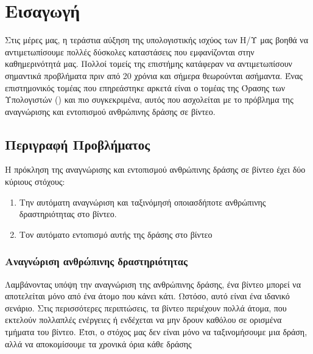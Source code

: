 



% 
\gr
\chapter{Εισαγωγή}
Στις μέρες μας, η τεράστια αύξηση της υπολογιστικής ισχύος των Η/Υ μας βοηθά να αντιμετωπίσουμε πολλές δύσκολες καταστάσεις που εμφανίζονται στην καθημερινότητά μας.
Πολλοί τομείς της επιστήμης κατάφεραν να αντιμετωπίσουν σημαντικά προβλήματα πριν από 20 χρόνια και σήμερα θεωρούνται ασήμαντα. Ένας επιστημονικός τομέας που επηρεάστηκε
αρκετά είναι ο τομέας της Όρασης των Υπολογιστών () και πιο συγκεκριμένα, αυτός που ασχολείται με το πρόβλημα της αναγνώρισης και  εντοπισμού ανθρώπινης δράσης σε βίντεο.
\section{Περιγραφή Προβλήματος}
H πρόκληση της αναγνώρισης και εντοπισμού ανθρώπινης δράσης σε βίντεο έχει δύο κύριους στόχους:
\begin{enumerate}
\item Την αυτόματη αναγνώριση και ταξινόμησή οποιασδήποτε ανθρώπινης δραστηριότητας στο βίντεο.
\item Τον αυτόματο εντοπισμό αυτής της δράσης στο βίντεο
\end{enumerate}


\subsection{Αναγνώριση ανθρώπινης δραστηριότητας}
Λαμβάνοντας υπόψη την αναγνώριση της ανθρώπινης δράσης, ένα βίντεο μπορεί να αποτελείται μόνο από ένα άτομο που κάνει κάτι. Ωστόσο, αυτό είναι ένα ιδανικό
σενάριο. Στις περισσότερες περιπτώσεις, τα βίντεο περιέχουν πολλά άτομα, που εκτελούν πολλαπλές ενέργειες ή ενδέχεται να μην δρουν καθόλου σε ορισμένα τμήματα
του βίντεο.
Έτσι, ο στόχος μας δεν είναι μόνο να ταξινομήσουμε μια δράση, αλλά να αποκομίσουμε τα χρονικά όρια κάθε δράσης

